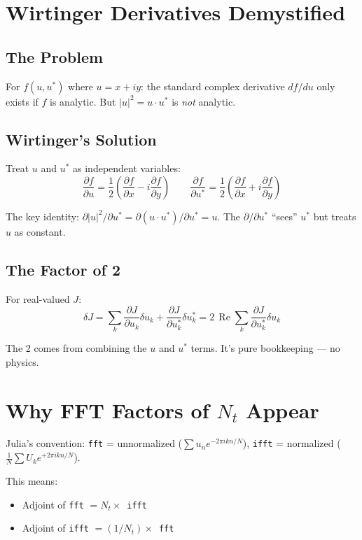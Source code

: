 \documentclass[12pt,a4paper]{article}
\newcommand{\Real}{\operatorname{Re}}
\newcommand{\pdv}[2]{\frac{\partial #1}{\partial #2}}
\begin{document}
\section{Wirtinger Derivatives Demystified}

\subsection{The Problem}

For $f(u, u^*)$ where $u = x + iy$: the standard complex derivative $df/du$ only exists if $f$ is analytic. But $|u|^2 = u\cdot u^*$ is \emph{not} analytic.

\subsection{Wirtinger's Solution}

Treat $u$ and $u^*$ as independent variables:
\begin{equation}
\pdv{f}{u} = \frac{1}{2}\!\left(\pdv{f}{x} - i\pdv{f}{y}\right) \qquad \pdv{f}{u^*} = \frac{1}{2}\!\left(\pdv{f}{x} + i\pdv{f}{y}\right)
\end{equation}

The key identity: $\partial|u|^2/\partial u^* = \partial(u\cdot u^*)/\partial u^* = u$. The $\partial/\partial u^*$ ``sees'' $u^*$ but treats $u$ as constant.

\subsection{The Factor of 2}

For real-valued $J$:
\begin{equation}
\delta J = \sum_k \pdv{J}{u_k}\delta u_k + \pdv{J}{u_k^*}\delta u_k^* = 2\,\Real\sum_k \pdv{J}{u_k^*}\delta u_k
\end{equation}

The 2 comes from combining the $u$ and $u^*$ terms. It's pure bookkeeping --- no physics.


\section{Why FFT Factors of $N_t$ Appear}

Julia's convention: \texttt{fft} = unnormalized ($\sum u_n e^{-2\pi ikn/N}$), \texttt{ifft} = normalized ($\frac{1}{N}\sum U_k e^{+2\pi ikn/N}$).

This means:
\begin{itemize}
    \item Adjoint of \texttt{fft} $= N_t \times$~\texttt{ifft}
    \item Adjoint of \texttt{ifft} $= (1/N_t) \times$~\texttt{fft}
\end{itemize}
\end{document}
